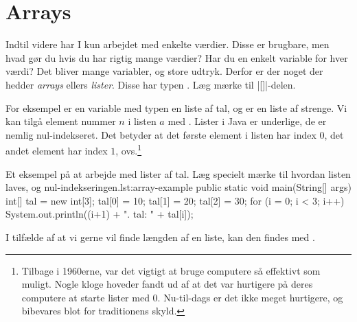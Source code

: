 
\section{Arrays}



    Indtil videre har I kun arbejdet med enkelte værdier. Disse er
    brugbare, men hvad gør du hvis du har rigtig mange værdier? Har du
    en enkelt variable for hver værdi? Det bliver mange variabler, og
    store udtryk. Derfor er der noget der hedder \emph{arrays} ellers
    \emph{lister}. Disse har typen . Læg mærke til
    \JavaInline|[]|-delen.

    For eksempel er en variable med typen  en liste
    af tal, og  er en liste af strenge. Vi kan
    tilgå element nummer \(n\) i listen \(a\) med .
    Lister i Java er underlige, de er nemlig nul-indekseret. Det betyder
    at det første element i listen har index \(0\), det andet element har
    index \(1\), ovs.\footnote{Tilbage i 1960erne, var det vigtigt at
    bruge computere så effektivt som muligt. Nogle kloge hoveder
    fandt ud af at det var hurtigere på deres computere at starte
    lister med 0. Nu-til-dags er det ikke meget hurtigere, og
    bibevares blot for traditionens skyld.}

    \begin{JavaCode}{Et eksempel på at arbejde med lister af tal. Læg specielt mærke til hvordan listen laves, og nul-indekseringen.}{lst:array-example}
        public static void main(String[] args) {
            int[] tal = new int[3];
            tal[0] = 10;
            tal[1] = 20;
            tal[2] = 30;
            for (i = 0; i < 3; i++) {
                System.out.println((i+1) + ". tal: "
                                         + tal[i]);
            }
        }
    \end{JavaCode}

    I tilfælde af at vi gerne vil finde længden af en liste, kan den findes med
    .

